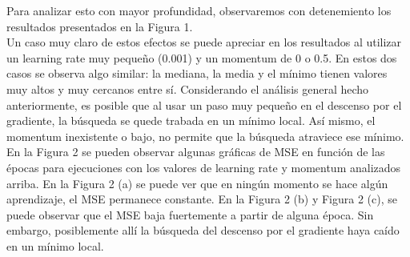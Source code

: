 \documentclass[12pt, a4paper]{article}
\begin{document}
\bigskip

Para analizar esto con mayor profundidad, observaremos con detenemiento los resultados presentados en la Figura 1. \\
Un caso muy claro de estos efectos se puede apreciar en los resultados al utilizar un learning rate muy pequeño (0.001) y un momentum de 0 o 0.5. En estos dos casos se observa algo similar: la mediana, la media y el mínimo tienen valores muy altos y muy cercanos entre sí. Considerando el análisis general hecho anteriormente, es posible que al usar un paso muy pequeño en el descenso por el gradiente, la búsqueda se quede trabada en un mínimo local. Así mismo, el momentum inexistente o bajo, no permite que la búsqueda atraviece ese mínimo.\\
En la Figura 2 se pueden observar algunas gráficas de MSE en función de las épocas para ejecuciones con los valores de learning rate y momentum analizados arriba. En la Figura 2 (a) se puede ver que en ningún momento se hace algún aprendizaje, el MSE permanece constante. En la Figura 2 (b) y Figura 2 (c), se puede observar que el MSE baja fuertemente a partir de alguna época. Sin embargo, posiblemente allí la búsqueda del descenso por el gradiente haya caído en un mínimo local.
\end{document}
